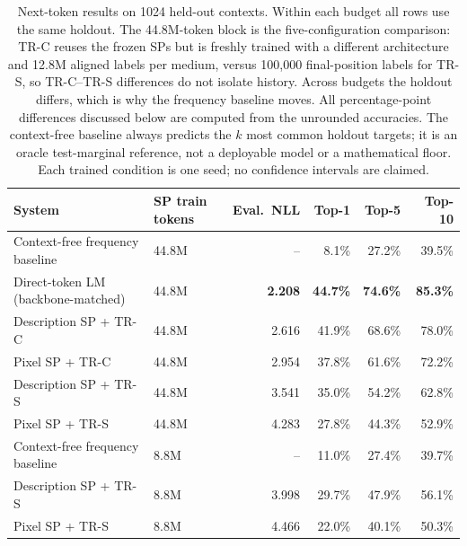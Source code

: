 \documentclass[11pt,a4paper]{article}
\begin{document}
\begin{table}[ht]
  \centering
  \small
  \begin{tabular}{llrrrr}
    \toprule
    System & SP train tokens & Eval.\ NLL & Top-1 & Top-5 & Top-10 \\
    \midrule
    Context-free frequency baseline & 44.8M & --    & 8.1\%           & 27.2\%           & 39.5\% \\
    Direct-token LM (backbone-matched) & 44.8M & \textbf{2.208} & \textbf{44.7\%} & \textbf{74.6\%} & \textbf{85.3\%} \\
    Description SP + TR-C      & 44.8M & 2.616 & 41.9\%          & 68.6\%           & 78.0\% \\
    Pixel SP + TR-C            & 44.8M & 2.954 & 37.8\%          & 61.6\%           & 72.2\% \\
    Description SP + TR-S      & 44.8M & 3.541 & 35.0\%          & 54.2\%           & 62.8\% \\
    Pixel SP + TR-S            & 44.8M & 4.283 & 27.8\%          & 44.3\%           & 52.9\% \\
    \midrule
    Context-free frequency baseline & 8.8M  & --    & 11.0\%          & 27.4\%           & 39.7\% \\
    Description SP + TR-S      & 8.8M  & 3.998 & 29.7\%          & 47.9\%           & 56.1\% \\
    Pixel SP + TR-S            & 8.8M  & 4.466 & 22.0\%          & 40.1\%           & 50.3\% \\
    \bottomrule
  \end{tabular}
  \caption{Next-token results on 1024 held-out contexts. Within each budget all rows use the same holdout. The 44.8M-token block is the five-configuration comparison: TR-C reuses the frozen SPs but is freshly trained with a different architecture and 12.8M aligned labels per medium, versus 100,000 final-position labels for TR-S, so TR-C--TR-S differences do not isolate history. Across budgets the holdout differs, which is why the frequency baseline moves. All percentage-point differences discussed below are computed from the unrounded accuracies. The context-free baseline always predicts the $k$ most common holdout targets; it is an oracle test-marginal reference, not a deployable model or a mathematical floor. Each trained condition is one seed; no confidence intervals are claimed.}
  \label{tab:pilot-results}
\end{table}
\end{document}
